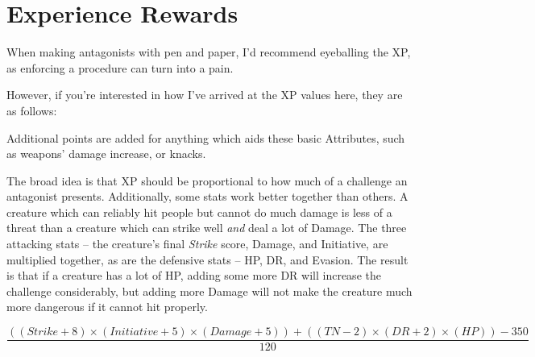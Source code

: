 \chapter{Experience Rewards}

\begin{multicols}{2}

\noindent When making antagonists with pen and paper, I'd recommend eyeballing the XP, as enforcing a procedure can turn into a pain.

However, if you're interested in how I've arrived at the XP values here, they are as follows:

Additional points are added for anything which aids these basic Attributes, such as weapons' damage increase, or knacks.

\label{lastpage}The broad idea is that XP should be proportional to how much of a challenge an antagonist presents.
Additionally, some stats work better together than others.
A creature which can reliably hit people but cannot do much damage is less of a threat than a creature which can strike well \emph{and} deal a lot of Damage.
The three attacking stats -- the creature's final \textit{Strike} score, Damage, and Initiative, are multiplied together, as are the defensive stats -- HP, DR, and Evasion.
The result is that if a creature has a lot of HP, adding some more DR will increase the challenge considerably, but adding more Damage will not make the creature much more dangerous if it cannot hit properly.

\end{multicols}

\begin{equation}
\frac{(( Strike + 8 ) \times ( Initiative + 5) \times ( Damage + 5 ) ) + ( ( TN -2 ) \times ( DR + 2 ) \times ( HP )) - 350}{120}
\end{equation}
